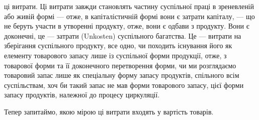 \parcont{}  %
ці витрати. Ці витрати завжди становлять частину суспільної праці в зреневленій
або живій формі — отже, в капіталістичній формі вони є затрати
капіталу, — що не беруть участи в утворенні продукту, отже, вони є одбави
з продукту. Вони є доконечні, це — затрати (Unkosten) суспільного
багатства. Це — витрати на зберігання суспільного продукту, все одно,
чи походить існування його як елементу товарового запасу лише
із суспільної форми продукції, отже, з товарової форми та її доконечного
перетворення форми, чи ми розглядаємо товаровий запас лише як спеціальну
форму запасу продуктів, спільного всім суспільствам, хоч би
такий запас не мав форми товарового запасу, цієї форми запасу продуктів,
належної до процесу циркуляції.

Тепер запитаймо, якою мірою ці витрати входять у вартість товарів.

